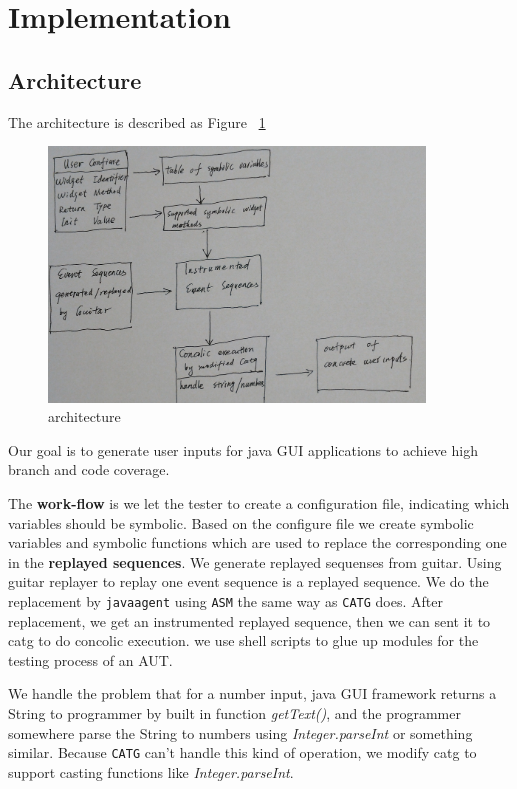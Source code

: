 \documentclass[blind]{sig-alternate-05-2015}
\begin{document}
\section{Implementation}

\subsection{Architecture}

The architecture is described as Figure ~\ref{figure:architecture}

\begin{figure}
  \centering
  \includegraphics[width=100mm,scale=0.5]{./res/archi-hand.jpg}
  \caption{architecture}
  \label{figure:architecture}
\end{figure}

Our goal is to generate user inputs for java GUI applications to achieve high branch and code coverage.

The \textbf{work-flow} is  we let the tester to create a configuration file, indicating which variables should be symbolic.
Based on the configure file we create symbolic variables and symbolic functions which are used to replace the corresponding one in the \textbf{replayed sequences}. We generate replayed sequenses from guitar. Using guitar replayer to replay one event sequence is a replayed sequence. We do the replacement by \texttt{javaagent} using \texttt{ASM} the same way as \texttt{CATG} does. After replacement, we get an instrumented replayed sequence, then we can sent it to catg to do concolic execution. we use shell scripts to glue up modules for the testing process of an AUT.

We handle the problem that for a number input, java GUI framework returns a String to programmer by built in function \textit{getText()}, and the programmer somewhere parse the String to numbers using \textit{Integer.parseInt} or something similar.  Because \texttt{CATG} can't handle this kind of operation, we modify catg to support casting functions like \textit{Integer.parseInt}.
\end{document}
